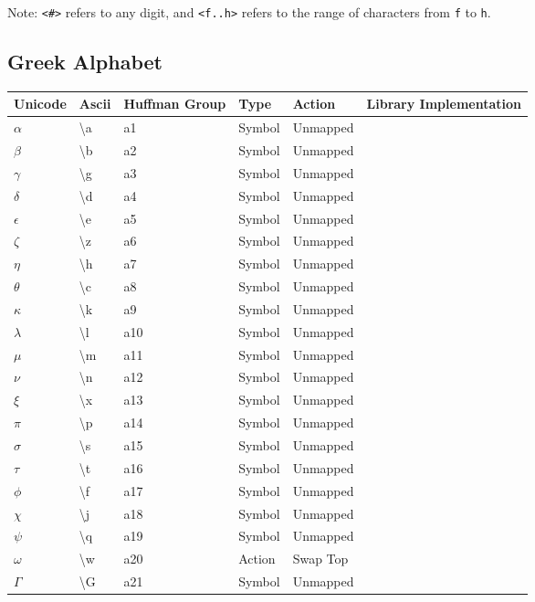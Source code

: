 \documentclass{article}
\newcommand\escape\textbackslash
\begin{document}
Note: \texttt{<\#>} refers to any digit, and \texttt{<f..h>} refers to the range of characters from
    \texttt f to \texttt h.

\subsection{Greek Alphabet}

\begin{tabular}{| >{\ttfamily}l| >{\ttfamily}l| >{\ttfamily}l|l|l| >{\ttfamily}l|}
    \hline
    \textbf{Unicode} & \textbf{Ascii} & \textbf{Huffman Group} & \textbf{Type} & \textbf{Action} & \textbf{Library Implementation}\\
    \hline
    $\alpha$ & \escape a & a1 & Symbol & Unmapped&\\
    $\beta$ & \escape b & a2 & Symbol & Unmapped&\\
    $\gamma$ & \escape g & a3 & Symbol & Unmapped&\\
    $\delta$ & \escape d & a4 & Symbol & Unmapped&\\
    $\epsilon$ & \escape e & a5 & Symbol & Unmapped&\\
    $\zeta$ & \escape z & a6 & Symbol & Unmapped&\\
    $\eta$ & \escape h & a7 & Symbol & Unmapped&\\
    $\theta$ & \escape c & a8 & Symbol & Unmapped&\\
    $\kappa$ & \escape k & a9 & Symbol & Unmapped&\\
    $\lambda$ & \escape l & a10 & Symbol & Unmapped&\\
    $\mu$ & \escape m & a11 & Symbol & Unmapped&\\
    $\nu$ & \escape n & a12 & Symbol & Unmapped&\\
    $\xi$ & \escape x & a13 & Symbol & Unmapped&\\
    $\pi$ & \escape p & a14 & Symbol & Unmapped&\\
    $\sigma$ & \escape s & a15 & Symbol & Unmapped&\\
    $\tau$ & \escape t & a16 & Symbol & Unmapped&\\
    $\phi$ & \escape f & a17 & Symbol & Unmapped&\\
    $\chi$ & \escape j & a18 & Symbol & Unmapped&\\
    $\psi$ & \escape q & a19 & Symbol & Unmapped&\\
    $\omega$ & \escape w & a20 & Action & Swap Top&\\
    $\Gamma$ & \escape G & a21 & Symbol & Unmapped&\\

\end{tabular}
\end{document}
